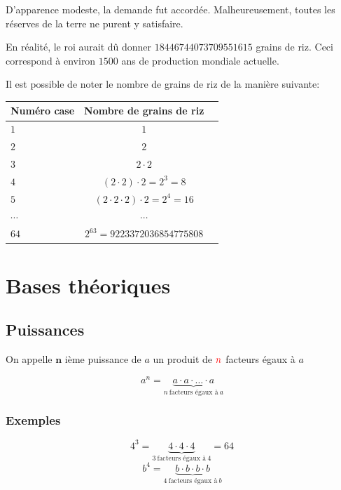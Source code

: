 \documentclass[
  12pt,
]{book}
\begin{document}
D'apparence modeste, la demande fut accordée. Malheureusement, toutes les réserves de la terre ne purent y satisfaire.

En réalité, le roi aurait dû donner \(18446744073709551615\) grains de riz. Ceci correspond à environ \(1500\) ans de production mondiale actuelle.

Il est possible de noter le nombre de grains de riz de la manière suivante:

\begin{longtable}[]{@{}lcr@{}}
\toprule
Numéro case & Nombre de grains de riz & \\
\midrule
\endhead
\(1\) & \(1\) & \\
\(2\) & \(2\) & \\
\(3\) & \(2\cdot 2\) & \\
\(4\) & \((2\cdot 2)\cdot 2=2^3=8\) & \\
\(5\) & \((2\cdot 2\cdot 2)\cdot 2=2^4=16\) & \\
\(\cdots\) & \(\cdots\) & \\
\(64\) & \(2^{63}=9223372036854775808\) & \\
\bottomrule
\end{longtable}

\hypertarget{bases-thuxe9oriques}{%
\section{Bases théoriques}\label{bases-thuxe9oriques}}

\hypertarget{puissances}{%
\subsection{Puissances}\label{puissances}}

\begin{defbox}
On appelle \(\textbf{n}\) ième puissance de \(a\) un produit de \({\color{red}n}\) facteurs égaux à \(a\)

\[ a^n = \underbrace{a\cdot a\cdot \ldots \cdot a}_{n~\text{facteurs égaux à}~a}\]

\end{defbox}

\hypertarget{exemples}{%
\subsubsection{Exemples}\label{exemples}}

\[4^3=\underbrace{4\cdot 4\cdot 4}_{3~\text{facteurs égaux à}~4} = 64\]
\[b^4=\underbrace{b\cdot b\cdot b\cdot b}_{4~\text{facteurs égaux à}~b}\]
\end{document}
